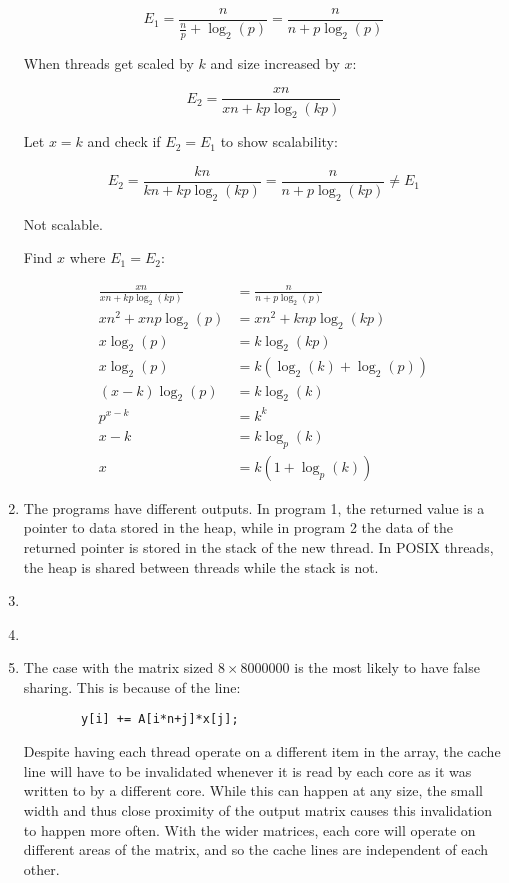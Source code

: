 \documentclass{article}
\begin{document}
\begin{enumerate}
          \[E_1 = \frac{n}{\frac{n}{p} + \log_2\left(p\right)} = \frac{n}{n + p \log_2\left(p\right)}\]

          When threads get scaled by \(k\) and size increased by \(x\):

          \[E_2 = \frac{xn}{xn + kp \log_2\left(kp\right)}\]

          Let \(x = k\) and check if \(E_2 = E_1\) to show scalability:

          \[E_2 = \frac{kn}{kn + kp \log_2\left(kp\right)} = \frac{n}{n + p \log_2\left(kp\right)} \neq E_1 \]

          Not scalable.

          Find \(x\) where \(E_1 = E_2\):

          \begin{align*}
              \frac{xn}{xn + kp \log_2\left(kp\right)} & = \frac{n}{n + p \log_2\left(p\right)} \\
              xn^2 + xnp \log_2(p)                     & = xn^2 + knp \log_2(kp)                \\
              x \log_2(p)                              & = k \log_2(kp)                         \\
              x \log_2(p)                              & = k \left(\log_2(k) + \log_2(p)\right) \\
              \left(x - k\right) \log_2 (p)            & = k \log_2 (k)                         \\
              p^{x - k}                                & = k^k                                  \\
              x - k                                    & = k \log_p (k)                         \\
              x                                        & = k (1 + \log_p(k))
          \end{align*}

    \item The programs have different outputs. In program 1, the returned value is a pointer to data stored in the heap, while in program 2 the data of the  returned pointer is stored in the stack of the new thread. In POSIX threads, the heap is shared between threads while the stack is not.
    \item \inputminted{c}{./barrier.c}
    \item \inputminted{c}{./prodcon.c}
    \item The case with the matrix sized \(8 \times 8000000\) is the most likely to have false sharing. This is because of the line:
          \begin{verbatim}
        y[i] += A[i*n+j]*x[j];
    \end{verbatim}
          Despite having each thread operate on a different item in the array, the cache line will have to be invalidated whenever it is read by each core as it was written to by a different core. While this can happen at any size, the small width and thus close proximity of the output matrix causes this invalidation to happen more often. With the wider matrices, each core will operate on different areas of the matrix, and so the cache lines are independent of each other.


\end{enumerate}
\end{document}
